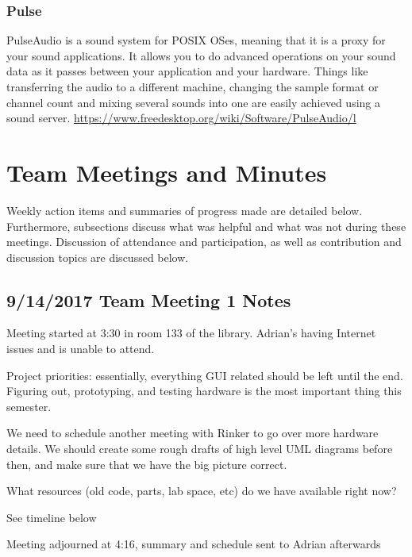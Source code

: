 \documentclass[12pt]{article}
\begin{document}
		\subsubsection{Pulse}
		 PulseAudio is a sound system for POSIX OSes, meaning that it is a proxy for your sound applications. It allows you to do advanced operations on your sound data as it passes between your application and your hardware. Things like transferring the audio to a different machine, changing the sample format or channel count and mixing several sounds into one are easily achieved using a sound server. \url{https://www.freedesktop.org/wiki/Software/PulseAudio/l}
		
	\newpage

\section{Team Meetings and Minutes}
	Weekly action items and summaries of progress made are detailed below. Furthermore, subsections discuss what was helpful and what was not during these meetings. Discussion of attendance and participation, as well as contribution and discussion topics are discussed below.

	\subsection{9/14/2017 Team Meeting 1 Notes}
\noindent
Meeting started at 3:30 in room 133 of the library. Adrian's having Internet issues and is unable to attend. 

\noindent
Project priorities: essentially, everything GUI related should be left until the end. Figuring out, prototyping, and testing hardware is the most important thing this semester.

\noindent
We need to schedule another meeting with Rinker to go over more hardware details. We should create some rough drafts of high level UML diagrams before then, and make sure that we have the big picture correct.

\noindent
What resources (old code, parts, lab space, etc) do we have available right now? 

\noindent
See timeline below

\noindent
Meeting adjourned at 4:16, summary and schedule sent to Adrian afterwards
\end{document}
